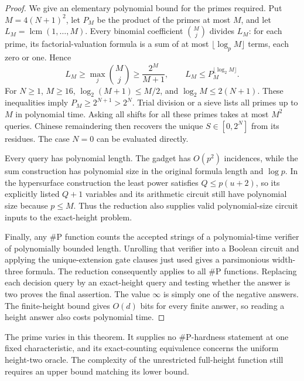 \begin{proof}
We give an elementary polynomial bound for the primes required. Put $M=4(N+1)^2$, let $P_M$ be the product of the primes at most $M$, and let $L_M=\operatorname{lcm}(1,\ldots,M)$. Every binomial coefficient $\binom Mj$ divides $L_M$: for each prime, its factorial-valuation formula is a sum of at most $\lfloor\log_p M\rfloor$ terms, each zero or one. Hence
\[
 L_M\ge\max_j\binom Mj\ge\frac{2^M}{M+1},
 \qquad L_M\le P_M^{\lfloor\log_2M\rfloor}.
\]
For $N\ge1$, $M\ge16$, $\log_2(M+1)\le M/2$, and $\log_2M\le2(N+1)$. These inequalities imply $P_M\ge2^{N+1}>2^N$. Trial division or a sieve lists all primes up to $M$ in polynomial time. Asking all shifts for all these primes takes at most $M^2$ queries. Chinese remaindering then recovers the unique $S\in[0,2^N]$ from its residues. The case $N=0$ can be evaluated directly.

Every query has polynomial length. The gadget has $O(p^2)$ incidences, while the sum construction has polynomial size in the original formula length and $\log p$. In the hypersurface construction the least power satisfies $Q\le p(u+2)$, so its explicitly listed $Q+1$ variables and its arithmetic circuit still have polynomial size because $p\le M$. Thus the reduction also supplies valid polynomial-size circuit inputs to the exact-height problem.

Finally, any $\#\mathrm P$ function counts the accepted strings of a polynomial-time verifier of polynomially bounded length. Unrolling that verifier into a Boolean circuit and applying the unique-extension gate clauses just used gives a parsimonious width-three formula. The reduction consequently applies to all $\#\mathrm P$ functions. Replacing each decision query by an exact-height query and testing whether the answer is two proves the final assertion. The value $\infty$ is simply one of the negative answers. The finite-height bound gives $O(d)$ bits for every finite answer, so reading a height answer also costs polynomial time.
\end{proof}
The prime varies in this theorem. It supplies no $\#\mathrm P$-hardness statement at one fixed characteristic, and its exact-counting equivalence concerns the uniform height-two oracle. The complexity of the unrestricted full-height function still requires an upper bound matching its lower bound.
